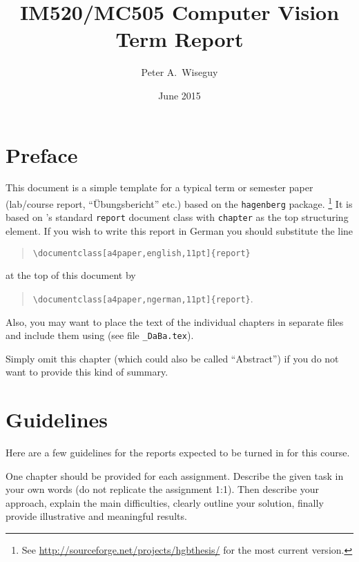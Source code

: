 \documentclass[a4paper,english,11pt]{report}
\author{Peter A.\ Wiseguy}
\title{IM520/MC505 Computer Vision\\ Term Report}
\date{June 2015}
\begin{document}
\maketitle
\tableofcontents

\chapter*{Preface} %

This document is a simple template for a typical term or semester paper (lab/course report, 
``Übungsbericht'' etc.) based on the \texttt{hagenberg} \latex package.%
\footnote{See \url{http://sourceforge.net/projects/hgbthesis/} for the most current version.}
It is based on \latex's standard \texttt{report} document class with \texttt{chapter} as the top 
structuring element.
If you wish to write this report in German you should substitute the line
\begin{quote}
 \verb!\documentclass[a4paper,english,11pt]{report}! 
\end{quote}
at the top of this document by
\begin{quote}
 \verb!\documentclass[a4paper,ngerman,11pt]{report}!.
\end{quote}
Also, you may want to place the text of the individual chapters in separate files and 
include them using \verb!! 
(see file \verb!_DaBa.tex!).

Simply omit this chapter (which could also be called ``Abstract'') if you do not want to provide this kind of summary.


\chapter{Guidelines}

Here are a few guidelines for the reports expected to be turned in for this course.

One chapter should be provided for each assignment.
Describe the given task in your own words (do not replicate the assignment 1:1). 
Then describe your approach, explain the main difficulties, clearly outline your solution, finally provide illustrative and meaningful results. 
\end{document}
